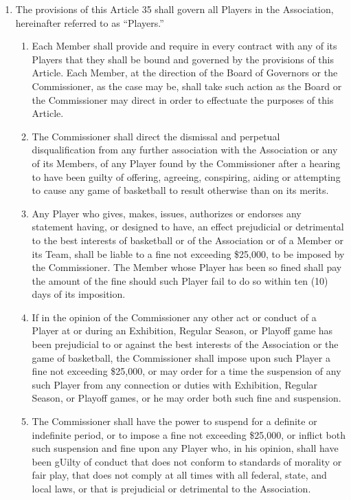 \documentclass[
]{book}
\providecommand{\tightlist}{%
  \setlength{\itemsep}{0pt}\setlength{\parskip}{0pt}}
\begin{document}
\begin{enumerate}
\def\labelenumi{\arabic{enumi}.}
\setcounter{enumi}{34}
\tightlist
\item
  The provisions of this Article 35 shall govern all Players in the Association, hereinafter referred to as ``Players.''

  \begin{enumerate}
  \def\labelenumii{(\alph{enumii})}
  \tightlist
  \item
    Each Member shall provide and require in every contract with any of its Players that they shall be bound and governed by the provisions of this Article. Each Member, at the direction of the Board of Governors or the Commissioner, as the case may be, shall take such action as the Board or the Commissioner may direct in order to effectuate the purposes of this Article.
  \item
    The Commissioner shall direct the dismissal and perpetual disqualification from any further association with the Association or any of its Members, of any Player found by the Commissioner after a hearing to have been guilty of offering, agreeing, conspiring, aiding or attempting to cause any game of basketball to result otherwise than on its merits.
  \item
    Any Player who gives, makes, issues, authorizes or endorses any statement having, or designed to have, an effect prejudicial or detrimental to the best interests of basketball or of the Association or of a Member or its Team, shall be liable to a fine not exceeding \$25,000, to be imposed by the Commissioner. The Member whose Player has been so fined shall pay the amount of the fine should such Player fail to do so within ten (10) days of its imposition.
  \item
    If in the opinion of the Commissioner any other act or conduct of a Player at or during an Exhibition, Regular Season, or Playoff game has been prejudicial to or against the best interests of the Association or the game of basketball, the Commissioner shall impose upon such Player a fine not exceeding \$25,000, or may order for a time the suspension of any such Player from any connection or duties with Exhibition, Regular Season, or Playoff games, or he may order both such fine and suspension.
  \item
    The Commissioner shall have the power to suspend for a definite or indefinite period, or to impose a fine not exceeding \$25,000, or inflict both such suspension and fine upon any Player who, in his opinion, shall have been gUilty of conduct that does not conform to standards of morality or fair play, that does not comply at all times with all federal, state, and local laws, or that is prejudicial or detrimental to the Association.

\end{enumerate}
\end{enumerate}
\end{document}
